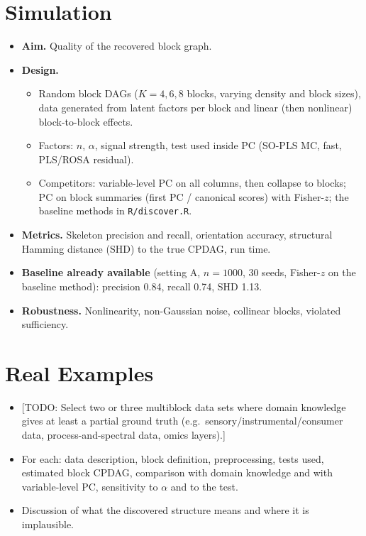 \documentclass[10pt,leqno]{amsart}
\newcommand{\todo}[1]{{\color{red}[TODO: #1]}}
\begin{document}
\section{Simulation}
\begin{itemize}
\item \textbf{Aim.} Quality of the recovered block graph.
\item \textbf{Design.}
  \begin{itemize}
  \item Random block DAGs ($K=4,6,8$ blocks, varying density and block sizes),
    data generated from latent factors per block and linear (then nonlinear)
    block-to-block effects.
  \item Factors: $n$, $\alpha$, signal strength, test used inside PC
    (SO-PLS MC, fast, PLS/ROSA residual).
  \item Competitors: variable-level PC on all columns, then collapse to blocks;
    PC on block summaries (first PC / canonical scores) with Fisher-$z$; the
    baseline methods in \texttt{R/discover.R}.
  \end{itemize}
\item \textbf{Metrics.} Skeleton precision and recall, orientation accuracy,
  structural Hamming distance (SHD) to the true CPDAG, run time.
\item \textbf{Baseline already available} (setting A, $n=1000$, 30 seeds, Fisher-$z$ on the
  baseline method): precision 0.84, recall 0.74, SHD 1.13.
\item \textbf{Robustness.} Nonlinearity, non-Gaussian noise, collinear blocks,
  violated sufficiency.
\end{itemize}

\section{Real Examples}
\begin{itemize}
\item \todo{Select two or three multiblock data sets where domain knowledge gives
  at least a partial ground truth (e.g.\ sensory/instrumental/consumer data,
  process-and-spectral data, omics layers).}
\item For each: data description, block definition, preprocessing, tests used,
  estimated block CPDAG, comparison with domain knowledge and with variable-level
  PC, sensitivity to $\alpha$ and to the test.
\item Discussion of what the discovered structure means and where it is implausible.
\end{itemize}
\end{document}
